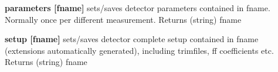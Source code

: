 \begin{DoxyItemize}
\item {\bfseries parameters \mbox{[}fname\mbox{]}} sets/saves detector parameters contained in fname. Normally once per different measurement. {\ttfamily Returns} {\ttfamily }(string) fname
\end{DoxyItemize}


\begin{DoxyItemize}
\item {\bfseries setup \mbox{[}fname\mbox{]}} sets/saves detector complete setup contained in fname (extensions automatically generated), including trimfiles, ff coefficients etc. {\ttfamily Returns} {\ttfamily }(string) fname 
\end{DoxyItemize}